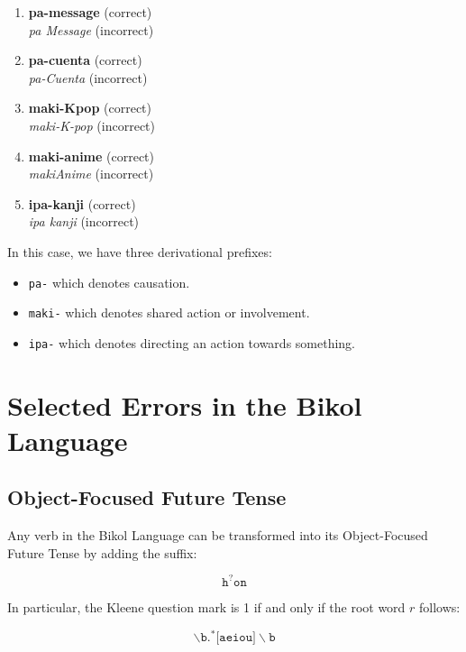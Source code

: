 \begin{example}
\end{example}
\begin{enumerate}
      \item \textbf{pa-message} (correct) \\
            \textit{pa Message} (incorrect)
      \item \textbf{pa-cuenta} (correct) \\
            \textit{pa-Cuenta} (incorrect)
      \item \textbf{maki-Kpop} (correct) \\
            \textit{maki-K-pop} (incorrect)
      \item \textbf{maki-anime} (correct) \\
            \textit{makiAnime} (incorrect)
      \item \textbf{ipa-kanji} (correct) \\
            \textit{ipa kanji} (incorrect)
\end{enumerate}

In this case, we have three derivational prefixes:
\begin{itemize}
    \item \texttt{pa-} which denotes causation.
    \item \texttt{maki-} which denotes shared action or involvement.
    \item \texttt{ipa-} which denotes directing an action towards something.
\end{itemize}

\section{Selected Errors in the Bikol Language}
\subsection{Object-Focused Future Tense}
Any verb in the Bikol Language can be transformed into its Object-Focused Future Tense by adding the suffix:

\[
      \texttt{h}^?\texttt{on}
\]

In particular, the Kleene question mark is 1 if and only if the root word $r$ follows:

\[
      \backslash\texttt{b.}^*\texttt{[aeiou]}\backslash\texttt{b}
\]

\begin{example}
\end{example}

